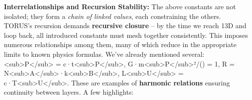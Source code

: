 \documentclass[
]{article}
\begin{document}
\textbf{Interrelationships and Recursion Stability:} The above constants
are not isolated; they form a \emph{chain of linked values}, each
constraining the others. TORUS's recursion demands \textbf{recursive
closure} -- by the time we reach 13D and loop back, all introduced
constants must mesh together consistently. This imposes numerous
relationships among them, many of which reduce in the appropriate limits
to known physics formulas. We've already mentioned several:
\ell\textless sub\textgreater P\textless/sub\textgreater{} =
c·t\textless sub\textgreater P\textless/sub\textgreater,
G·m\textless sub\textgreater P\textless/sub\textgreater²/(\hbarc) = 1, R =
N\textless sub\textgreater A\textless/sub\textgreater·k\textless sub\textgreater B\textless/sub\textgreater,
L\textless sub\textgreater U\textless/sub\textgreater{} =
c·T\textless sub\textgreater U\textless/sub\textgreater. These are
examples of \textbf{harmonic relations} ensuring continuity between
layers. A few highlights:
\end{document}
